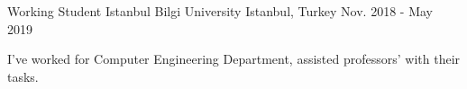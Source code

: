 \begin{cventries}

\cventry
{Working Student} %
{Istanbul Bilgi University} %
{Istanbul, Turkey} %
{Nov. 2018 - May 2019} %
{ %
\begin{cvitems}
\item {I've worked for Computer Engineering Department, assisted professors' with their tasks.}
\end{cvitems}
}

\end{cventries}